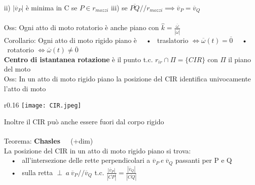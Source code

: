 \documentclass{article}
\begin{document}
\phantom{\ }ii) $|\overline{v}_P|$ è minima in C se $P \in r_{mozzi}$ \hspace{0.42in}
iii) se $\overline{PQ} /\!\!/ r_{mozzi} \implies \overline{v}_P = \overline{v}_Q$ \\ \\
%
%
%
Oss: Ogni atto di moto rotatorio è anche piano con $\hat{k}=\frac{\overline{\omega}}{|\overline{\omega}|}$ \\
Corollario: Ogni atto di moto rigido piano è
\ \ • \ traslatorio $\Longleftrightarrow \overline{\omega}(t)=\overline{0}$
\ \ • \ rotatorio $\Longleftrightarrow \overline{\omega}(t) \neq \overline{0}$ \\
\textbf{Centro di istantanea rotazione} è il punto t.c. $r_{ir} \cap \Pi = \{CIR\}$ con $\Pi$ il piano del moto \\
%
Oss: In un atto di moto rigido piano la posizione del CIR identifica univocamente l'atto di moto
%
%
\begin{wrapfigure}{r}{0.16\textwidth}
\texttt{[image: CIR.jpeg]}
\end{wrapfigure}

\phantom{\ \ \ }  Inoltre il CIR può anche essere fuori dal corpo rigido \\ \\
%
%
%
Teorema: \textbf{Chasles}\ \ \ (+dim)\\ 
\phantom{\ }La posizione del CIR in un atto di moto rigido piano si trova: \\
\ \ • \ all'intersezione delle rette perpendicolari a $\overline{v}_P \ e\ \overline{v}_Q$ passanti per P e Q \\
\ \ • \ sulla retta $\perp \ a \ \overline{v}_P /\!\!/ \overline{v}_Q$ t.c. $\frac{|\overline{v}_P|}{|\overline{CP}|} = \frac{|\overline{v}_Q|}{|\overline{CQ}|}$ \\
\pagebreak
\end{document}
